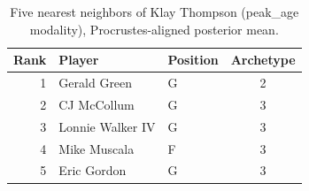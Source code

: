 \begin{table}[htbp]
  \centering\small
  \begin{tabular}{rllc}
    \toprule
    Rank & Player & Position & Archetype \\
    \midrule
    1 & Gerald Green & G & 2 \\
    2 & CJ McCollum & G & 3 \\
    3 & Lonnie Walker IV & G & 3 \\
    4 & Mike Muscala & F & 3 \\
    5 & Eric Gordon & G & 3 \\
    \bottomrule
  \end{tabular}
  \caption{Five nearest neighbors of Klay Thompson (peak_age modality), Procrustes-aligned posterior mean.}
  \label{tab:Klay_Thompson_neighbors_peak_age}
\end{table}

